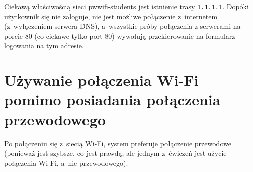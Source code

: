 \documentclass[a4paper,11pt]{article}
\begin{document}
Ciekawą właściwością sieci pwwifi-students jest istnienie trasy
\verb|1.1.1.1|. Dopóki użytkownik się nie zaloguje, nie jest możliwe
połączenie z~internetem (z~wyłączeniem serwera DNS), a~wszystkie
próby połączenia z serwerami na porcie 80 (co ciekawe tylko port 80)
wywołują przekierowanie na formularz logowania na tym adresie.

\section{Używanie połączenia Wi-Fi pomimo posiadania połączenia przewodowego}

Po połączeniu się z~siecią Wi-Fi, system preferuje połączenie przewodowe
(ponieważ jest szybsze, co jest prawdą, ale jednym z~ćwiczeń jest użycie
połączenia Wi-Fi, a~nie przewodowego).
\end{document}
